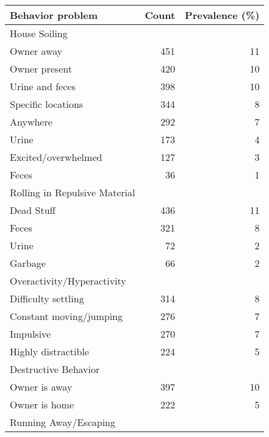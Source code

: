 \documentclass[varwidth=\maxdimen]{standalone}
\newcommand{\subrow}[1]{\hspace{1.25em}#1}
\begin{document}
\begin{tabular}[t]{lrr}
\toprule
Behavior problem &  Count &  Prevalence (\%) \\
\midrule
House Soiling \\
  \subrow{Owner away}                          &      451 &              11 \\
  \subrow{Owner present}                       &      420 &              10 \\
  \subrow{Urine and feces}                     &      398 &              10 \\
  \subrow{Specific locations}                 &      344 &               8 \\
  \subrow{Anywhere}                            &      292 &               7 \\
  \subrow{Urine}                               &      173 &               4 \\
  \subrow{Excited/overwhelmed}                 &      127 &               3 \\
  \subrow{Feces}                               &       36 &               1 \\
Rolling in Repulsive Material \\
  \subrow{Dead Stuff}                          &      436 &              11 \\
  \subrow{Feces}                               &      321 &               8 \\
  \subrow{Urine}                               &       72 &               2 \\
  \subrow{Garbage}                             &       66 &               2 \\
Overactivity/Hyperactivity \\
  \subrow{Difficulty settling}                 &      314 &               8 \\
  \subrow{Constant moving/jumping}             &      276 &               7 \\
  \subrow{Impulsive}                           &      270 &               7 \\
  \subrow{Highly distractible}                 &      224 &               5 \\
Destructive Behavior \\
  \subrow{Owner is away}                       &      397 &              10 \\
  \subrow{Owner is home}                       &      222 &               5 \\
Running Away/Escaping \\

\end{tabular}
\end{document}
